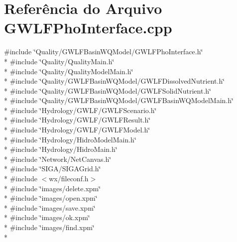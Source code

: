 \section{Referência do Arquivo G\+W\+L\+F\+Pho\+Interface.\+cpp}
\label{_g_w_l_f_pho_interface_8cpp}
{\ttfamily \#include \char`\"{}Quality/\+G\+W\+L\+F\+Basin\+W\+Q\+Model/\+G\+W\+L\+F\+Pho\+Interface.\+h\char`\"{}}\\*
{\ttfamily \#include \char`\"{}Quality/\+Quality\+Main.\+h\char`\"{}}\\*
{\ttfamily \#include \char`\"{}Quality/\+Quality\+Model\+Main.\+h\char`\"{}}\\*
{\ttfamily \#include \char`\"{}Quality/\+G\+W\+L\+F\+Basin\+W\+Q\+Model/\+G\+W\+L\+F\+Dissolved\+Nutrient.\+h\char`\"{}}\\*
{\ttfamily \#include \char`\"{}Quality/\+G\+W\+L\+F\+Basin\+W\+Q\+Model/\+G\+W\+L\+F\+Solid\+Nutrient.\+h\char`\"{}}\\*
{\ttfamily \#include \char`\"{}Quality/\+G\+W\+L\+F\+Basin\+W\+Q\+Model/\+G\+W\+L\+F\+Basin\+W\+Q\+Model\+Main.\+h\char`\"{}}\\*
{\ttfamily \#include \char`\"{}Hydrology/\+G\+W\+L\+F/\+G\+W\+L\+F\+Scenario.\+h\char`\"{}}\\*
{\ttfamily \#include \char`\"{}Hydrology/\+G\+W\+L\+F/\+G\+W\+L\+F\+Result.\+h\char`\"{}}\\*
{\ttfamily \#include \char`\"{}Hydrology/\+G\+W\+L\+F/\+G\+W\+L\+F\+Model.\+h\char`\"{}}\\*
{\ttfamily \#include \char`\"{}Hydrology/\+Hidro\+Model\+Main.\+h\char`\"{}}\\*
{\ttfamily \#include \char`\"{}Hydrology/\+Hidro\+Main.\+h\char`\"{}}\\*
{\ttfamily \#include \char`\"{}Network/\+Net\+Canvas.\+h\char`\"{}}\\*
{\ttfamily \#include \char`\"{}S\+I\+G\+A/\+S\+I\+G\+A\+Grid.\+h\char`\"{}}\\*
{\ttfamily \#include $<$wx/fileconf.\+h$>$}\\*
{\ttfamily \#include \char`\"{}images/delete.\+xpm\char`\"{}}\\*
{\ttfamily \#include \char`\"{}images/open.\+xpm\char`\"{}}\\*
{\ttfamily \#include \char`\"{}images/save.\+xpm\char`\"{}}\\*
{\ttfamily \#include \char`\"{}images/ok.\+xpm\char`\"{}}\\*
{\ttfamily \#include \char`\"{}images/find.\+xpm\char`\"{}}\\*
